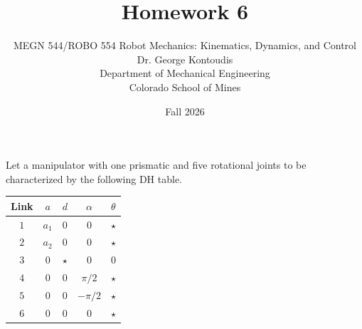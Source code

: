 \documentclass[12pt]{article}
\newenvironment{problem}[2][Problem]{\begin{trivlist}
\item[\hskip \labelsep {\bfseries #1}\hskip \labelsep {\bfseries #2.}]}{\end{trivlist}}
\begin{document}
 
 
\title{Homework 6}
\author{MEGN 544/ROBO 554 Robot Mechanics: Kinematics, Dynamics, and Control  
\\ 
Dr. George Kontoudis\\
Department of Mechanical Engineering\\
Colorado School of Mines}
\date{Fall 2026}
 
\maketitle
\begin{problem}{1}%
Let a manipulator with one prismatic and five rotational joints to be characterized by the following DH table.
\begin{table}[!h]
\centering
\begin{tabular}{c | c | c | c | c}
\hline 
 {Link} & $a$   & $d$      & $\alpha$ & $\theta$\\  \hline
 $1$    & $a_1$ & $0$      & $0$      & $\star$ \\ 
 $2$    & $a_2$ & $0$      & $0$      & $\star$ \\ 
 $3$    & $0$   & $\star$  & $0$      & $0$ \\ 
 $4$    & $0$   & $0$      & $\pi/2$  & $\star$ \\ 
 $5$    & $0$   & $0$      & $-\pi/2$ & $\star$ \\ 
 $6$    & $0$   & $0$      & $0$      & $\star$ \\ \hline
\end{tabular}\label{tab:part_1_ii}
\end{table}


\end{problem}
\end{document}
